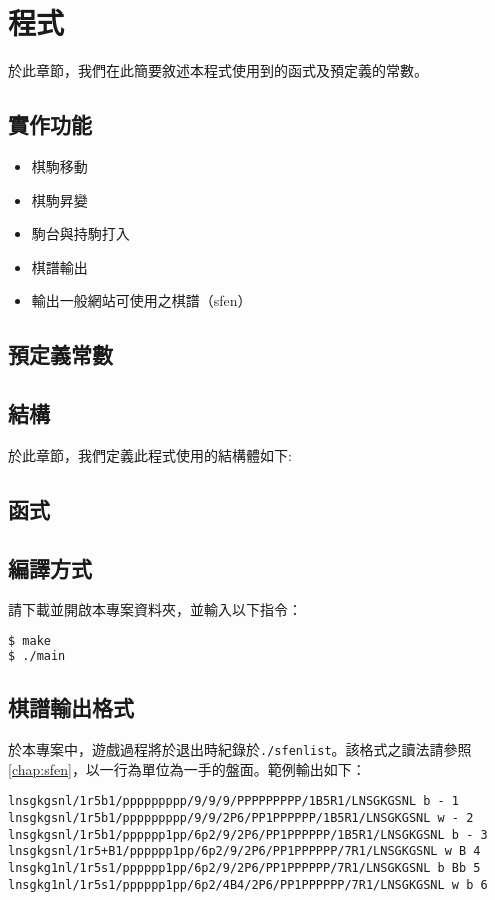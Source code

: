 	\section{程式}
	於此章節，我們在此簡要敘述本程式使用到的函式及預定義的常數。
	\subsection{實作功能}
	\begin{itemize}
	    \item 棋駒移動
	    \item 棋駒昇變
	    \item 駒台與持駒打入
	    \item 棋譜輸出
	    \item 輸出一般網站可使用之棋譜（sfen）
	\end{itemize}
	\subsection{預定義常數}
	
	\subsection{結構}
	於此章節，我們定義此程式使用的結構體如下:
	
	\subsection{函式}

	

	\subsection{編譯方式}
	    請下載並開啟本專案資料夾，並輸入以下指令：
	    \begin{lstlisting}[language=sh,caption=Compile Parameters]
$ make  
$ ./main	     \end{lstlisting}

\subsection{棋譜輸出格式}
於本專案中，遊戲過程將於退出時紀錄於\verb|./sfenlist|。該格式之讀法請參照\autoref{chap:sfen}，以一行為單位為一手的盤面。範例輸出如下：
\begin{lstlisting}
lnsgkgsnl/1r5b1/ppppppppp/9/9/9/PPPPPPPPP/1B5R1/LNSGKGSNL b - 1
lnsgkgsnl/1r5b1/ppppppppp/9/9/2P6/PP1PPPPPP/1B5R1/LNSGKGSNL w - 2
lnsgkgsnl/1r5b1/pppppp1pp/6p2/9/2P6/PP1PPPPPP/1B5R1/LNSGKGSNL b - 3
lnsgkgsnl/1r5+B1/pppppp1pp/6p2/9/2P6/PP1PPPPPP/7R1/LNSGKGSNL w B 4
lnsgkg1nl/1r5s1/pppppp1pp/6p2/9/2P6/PP1PPPPPP/7R1/LNSGKGSNL b Bb 5
lnsgkg1nl/1r5s1/pppppp1pp/6p2/4B4/2P6/PP1PPPPPP/7R1/LNSGKGSNL w b 6
\end{lstlisting}

